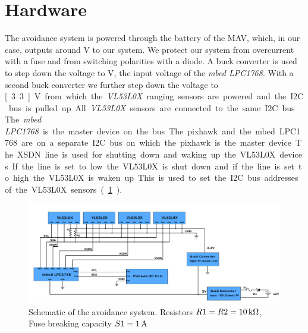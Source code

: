 \section{Hardware}
The avoidance system is powered through the battery of the MAV, which, in our case, outputs around \unit[12]{V} to our system. We protect our system from overcurrent with a fuse and from switching polarities with a diode. A buck converter is used to step down the voltage to \unit[5]{V}, the input voltage of the \textit{mbed LPC1768}. With a second buck converter we further step down the voltage to \unit[3.3]{V} from which the \textit{VL53L0X} ranging sensors are powered and the I2C bus is pulled up. All \textit{VL53L0X} sensors are connected to the same I2C bus. The \textit{mbed LPC1768} is the master device on the bus. The pixhawk and the mbed LPC1768 are on a separate I2C bus on which the pixhawk is the master device. The XSDN line is used for shutting down and waking up the VL53L0X devices. If the line is set to low the VL53L0X is shut down and if the line is set to high the VL53L0X is waken up. This is used to set the I2C bus addresses of the VL53L0X sensors (\cref{fig:schematics}). 

\begin{landscape}
	\begin{figure}
		\centering
		\includegraphics[width=\linewidth]{pictures/wire_schematic.pdf}
		\caption{Schematic of the avoidance system. Resistors $R1=R2=\unit[10]{k\Omega}$, Fuse breaking capacity $S1=\unit[1]{A}$}
		\label{fig:schematics}
	\end{figure}
\end{landscape}
